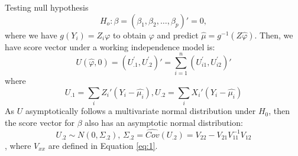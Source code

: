 \documentclass[compress]{beamer}
\begin{document}
{%
%


\framebreak
\scriptsize
Testing null hypothesis
$$H_{o}:\beta=(\beta_{1},\beta_{2},\ldots,\beta_{p})'=0,$$ 
where we have $g(Y_i)=Z_i\varphi$ to obtain $\varphi$ and predict $\hat{\mu}=g^{-1}(Z\hat{\varphi})$. Then, we have score vector under a working independence model is:
$$U(\hat{\varphi},0)=(U_{.1}^{'}, U_{.2}^{'})'=\sum_{i=1}^{n}(U_{i1}^{'},U_{i2}^{'})'$$
where
$$U_{.1}=\sum_{i}Z_{i}'(Y_{i}-\hat{\mu_{i}}), U_{.2}=\sum_{i}X_{i}'(Y_{i}-\hat{\mu_{i}})$$ 
As $U$ asymptotically follows a multivariate normal distribution under $H_{0}$, then the score vector for $\beta$ also has an asymptotic normal distribution:\\
$$
U_{.2}\sim N(0,\Sigma_{.2}),\,\Sigma_{.2}= \widehat{Cov} (U_{.2}) = V_{22} - V_{21} V_{11}^{-1} V_{12}
$$, where $V_{xx}$ are defined in Equation \ref{eq:1}.

}
\end{document}
